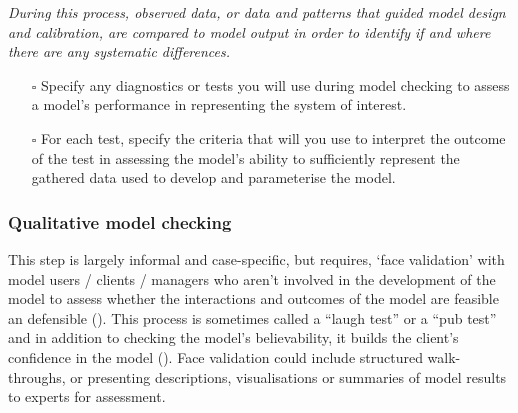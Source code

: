 \documentclass[
]{article}
\providecommand{\tightlist}{%
  \setlength{\itemsep}{0pt}\setlength{\parskip}{0pt}}\usepackage{longtable,booktabs,array}
\begin{document}
\begin{tcolorbox}[enhanced jigsaw, rightrule=.15mm, titlerule=0mm, coltitle=black, opacityback=0, bottomrule=.15mm, colback=white, opacitybacktitle=0.6, title=\textcolor{quarto-callout-caution-color}{\faFire}\hspace{0.5em}{Preregistration Item}, toprule=.15mm, colframe=quarto-callout-caution-color-frame, left=2mm, leftrule=.75mm, breakable, bottomtitle=1mm, colbacktitle=quarto-callout-caution-color!10!white, toptitle=1mm, arc=.35mm]

\emph{During this process, observed data, or data and patterns that
guided model design and calibration, are compared to model output in
order to identify if and where there are any systematic differences.}

\begin{itemize}
\tightlist
\item[$\square$]
  Specify any diagnostics or tests you will use during model checking to
  assess a model's performance in representing the system of interest.
\item[$\square$]
  For each test, specify the criteria that will you use to interpret the
  outcome of the test in assessing the model's ability to sufficiently
  represent the gathered data used to develop and parameterise the
  model.
\end{itemize}

\end{tcolorbox}

\subsubsection{Qualitative model
checking}\label{qualitative-model-checking}

\begin{tcolorbox}[enhanced jigsaw, rightrule=.15mm, titlerule=0mm, coltitle=black, opacityback=0, bottomrule=.15mm, colback=white, opacitybacktitle=0.6, title=\textcolor{quarto-callout-note-color}{\faInfo}\hspace{0.5em}{Explanation}, toprule=.15mm, colframe=quarto-callout-note-color-frame, left=2mm, leftrule=.75mm, breakable, bottomtitle=1mm, colbacktitle=quarto-callout-note-color!10!white, toptitle=1mm, arc=.35mm]

This step is largely informal and case-specific, but requires‚ `face
validation' with model users / clients / managers who aren't involved in
the development of the model to assess whether the interactions and
outcomes of the model are feasible an defensible
(). This process is
sometimes called a ``laugh test'' or a ``pub test'' and in addition to
checking the model's believability, it builds the client's confidence in
the model (). Face
validation could include structured walk-throughs, or presenting
descriptions, visualisations or summaries of model results to experts
for assessment.

\end{tcolorbox}
\end{document}
